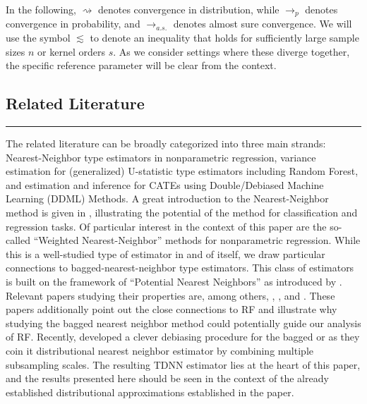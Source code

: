 In the following, $\rightsquigarrow$ denotes convergence in distribution, while
$\rightarrow_{p}$ denotes convergence in probability, and $\rightarrow_{a.s.}$
denotes almost sure convergence. We will use the symbol $\lesssim$ to denote an
inequality that holds for sufficiently large sample sizes $n$ or kernel orders
$s$. As we consider settings where these diverge together, the specific
reference parameter will be clear from the context.

\subsection{Related Literature}
\hrule
The related literature can be broadly categorized into three main strands: Nearest-Neighbor type estimators in nonparametric regression, variance estimation for (generalized) U-statistic type estimators including Random Forest, and estimation and inference for CATEs using Double/Debiased Machine Learning (DDML) Methods.
A great introduction to the Nearest-Neighbor method is given in \citet{biau_lectures_2015}, illustrating the potential of the method for classification and regression tasks.
Of particular interest in the context of this paper are the so-called ``Weighted Nearest-Neighbor'' methods for nonparametric regression.
While this is a well-studied type of estimator in and of itself, we draw particular connections to bagged-nearest-neighbor type estimators.
This class of estimators is built on the framework of ``Potential Nearest Neighbors'' as introduced by \citet{lin_random_2006}.
Relevant papers studying their properties are, among others, \citet{biau_rate_2010}, \citet{biau_layered_2010}, and \citet{steele_exact_2009}.
These papers additionally point out the close connections to RF and illustrate why studying the bagged nearest neighbor method could potentially guide our analysis of RF.
Recently, \citet{demirkaya_optimal_2024} developed a clever debiasing procedure for the bagged or as they coin it distributional nearest neighbor estimator by combining multiple subsampling scales.
The resulting TDNN estimator lies at the heart of this paper, and the results presented here should be seen in the context of the already established distributional approximations established in the paper.

